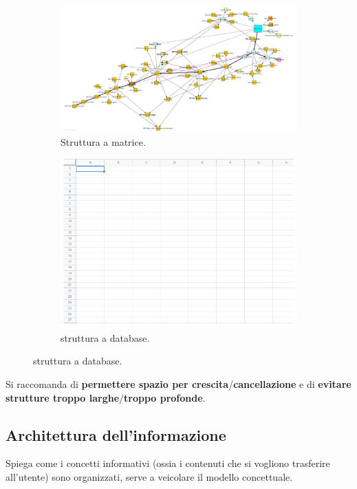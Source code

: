 \begin{figure}[!h]
	\begin{subfigure}[!h]{0.49 \textwidth}
		\centering
		\includegraphics[scale=0.15]{immagini/struttura-matrice.png}
		\caption{Struttura a matrice.}
	\end{subfigure}
	\begin{subfigure}[!h]{0.49 \textwidth}
		\centering
		\includegraphics[scale=0.3]{immagini/struttura-database.png}
		\caption{struttura a database.}
	\end{subfigure}
\end{figure}

Si raccomanda di \textbf{permettere spazio per crescita}/\textbf{cancellazione} e di \textbf{evitare strutture troppo larghe}/\textbf{troppo profonde}.

\subsection*{Architettura dell'informazione}
Spiega come i concetti informativi (ossia i contenuti che si vogliono trasferire all'utente) sono organizzati, serve a veicolare il modello concettuale.

